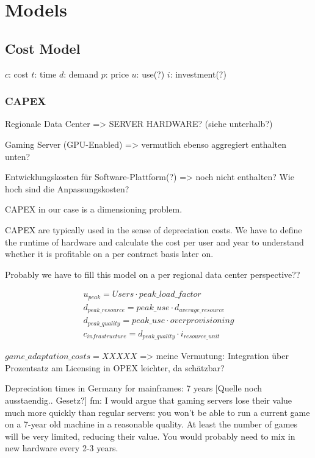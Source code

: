 \section{Models}


\subsection{Cost Model}


$c$: cost
$t$: time
$d$: demand
$p$: price
$u$: use(?)
$i$: investment(?)

\subsubsection{CAPEX}

Regionale Data Center => SERVER HARDWARE? (siehe unterhalb?)

Gaming Server (GPU-Enabled) => vermutlich ebenso aggregiert enthalten unten?

Entwicklungskosten für Software-Plattform(?) => noch nicht enthalten? Wie hoch sind die Anpassungskosten?

CAPEX in our case is a dimensioning problem.

CAPEX are typically used in the sense of depreciation costs. We have to define the runtime of hardware and calculate the cost per user and year to understand whether it is profitable on a per contract basis later on.

Probably we have to fill this model on a per regional data center perspective??

\begin{align*}
u_{peak} = Users \cdot peak\_load\_factor \\
d_{peak\_resource} = peak\_use \cdot d_{average\_resource} \\
d_{peak\_quality} = peak\_use \cdot overprovisioning \\
c_{infrastructure} = d_{peak\_quality} \cdot i_{resource\_unit}
\end{align*}

$game\_adaptation\_costs = XXXXX$ => meine Vermutung: Integration über Prozentsatz am Licensing in OPEX leichter, da schätzbar?

Depreciation times in Germany for mainframes: 7 years [Quelle noch ausstaendig.. Gesetz?]
fm: I would argue that gaming servers lose their value much more quickly than regular servers: you won't be able to run a current game on a 7-year old machine in a reasonable quality. At least the number of games will be very limited, reducing their value. 
You would probably need to mix in new hardware every 2-3 years.

